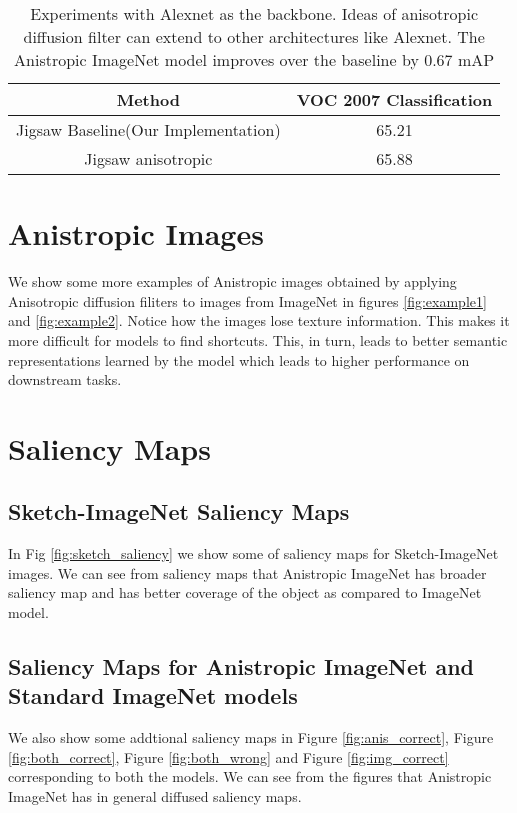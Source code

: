 \documentclass{bmvc2k}
\begin{document}
\begin{table*}
\begin{center}
\caption{Experiments with Alexnet as the backbone. Ideas of anisotropic diffusion filter can extend to other architectures like Alexnet. The Anistropic ImageNet model improves over the baseline by 0.67 mAP}
\begin{tabular}{cc} 
\toprule
Method    & VOC 2007 Classification \\
\midrule
Jigsaw Baseline(Our Implementation)     & 65.21    \\
Jigsaw anisotropic   & 65.88    \\
\bottomrule
\end{tabular}
\label{tab: Alexnet_Experiments}
\end{center}
\end{table*}









\section{Anistropic Images}
We show some more examples of Anistropic images obtained by applying Anisotropic diffusion filiters to images from ImageNet \cite{imagenet_cvpr09} in figures \ref{fig:example1} and \ref{fig:example2}.  Notice how the images lose texture information. This makes it more difficult for models to find shortcuts. This, in turn, leads to better semantic representations learned by the model which leads to higher performance on downstream tasks.




\section{Saliency Maps}
\subsection{Sketch-ImageNet Saliency Maps}
In Fig \ref{fig:sketch_saliency} we show some of saliency maps for Sketch-ImageNet images. We can see from saliency maps that Anistropic ImageNet has broader saliency map and has better coverage of the object as compared to ImageNet model. 
\subsection{Saliency Maps for Anistropic ImageNet and Standard ImageNet models}
We also show some addtional saliency maps in Figure \ref{fig:anis_correct}, Figure \ref{fig:both_correct}, Figure \ref{fig:both_wrong} and Figure \ref{fig:img_correct} corresponding to both the models. We can see from the figures that Anistropic ImageNet has in general diffused saliency maps.
\end{document}
